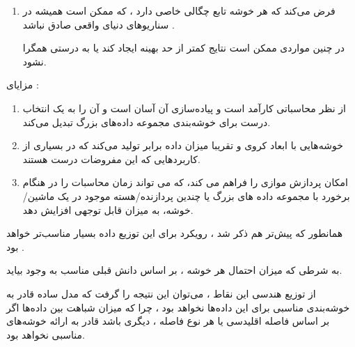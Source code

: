 \begin{boxM}
\begin{enumerate}
            \item 
            فرض می‌کند که هر خوشه تابع چگالی خاصی دارد ، که ممکن است همیشه در سناریوهای دنیای واقعی صادق نباشد .

            در چنین مواردی ممکن است نتایج کمتر از حد بهینه ایجاد کند یا به درستی همگرا نشود.
        \end{enumerate}


        مزایای
         :
        \begin{enumerate}
            \item 
            از نظر محاسباتی کارآمد است و پیاده‌سازی آن آسان است و آن را به یک انتخاب درست برای خوشه‌بندی مجموعه داده‌های بزرگ تبدیل می‌کند.
                     
            \item 
            خوشه‌هایی با ابعاد کروی و تقریبا میزان داده برابر تولید می‌کند که در بسیاری از کاربردهایی که این مفروضات درست هستند.
            
            \item
            امکان پردازش موازی را فراهم می کند، که می تواند زمان محاسبات را در هنگام برخورد با مجموعه داده های بزرگ یا چندین پردازنده/هسته موجود در یک ماشین/خوشه، به میزان قابل توجهی افزایش دهد.
        \end{enumerate}
        
\end{boxM}

\begin{boxM}
    همانطور که پیش‌تر هم ذکر شد ، رویکرد 
    برای این توزیع داده بسیار مناسب‌تر خواهد بود . 

    به شرطی که میزان احتمال هر خوشه ، بر اساس دانش قبلی مناسب به وجود بیاید.

    از توزیع هندسی این نقاط ، می‌توان این نتیجه را گرفت که مدل ساده 
    قادر به خوشه‌بندی مناسبی برای این داده‌ها نخواهد بود ، چرا که میزان شباهت بین داده‌ها اگر بر اساس فاصله اقلیدسی یا هر نوع فاصله    ، دیگری باشد 
    قادر به ارائه خوشه‌های مناسبی نخواهد بود.

\end{boxM}